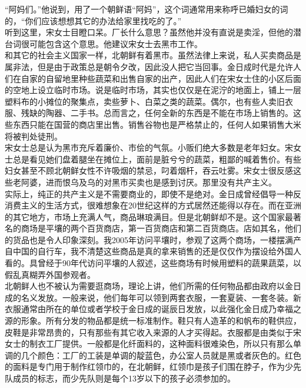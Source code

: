 \begin{multicols}{\theparacolNo}
“阿妈们。”他说到，用了一个朝鲜语“阿妈”，这个词通常用来称呼已婚妇女的词的，“你们应该想想其它的办法给家里找吃的了。”\\

听到这里，宋女士目瞪口呆。厂长什么意思？虽然他并没有直说是卖淫，但他的潜台词很可能包含这个意思。他建议宋女士去黑市工作。\\

和其它的社会主义国家一样，北朝鲜有着黑市。虽然法律上来说，私人买卖商品是属非法，但是由于政策总是朝令夕改，因此没人把它当回事。金日成时代是允许人们在自家的自留地里种些蔬菜和出售自家的出产，因此人们在宋女士住的小区后面的空地上设立临时市场。说是临时市场，其实也仅仅是在泥泞的地面上，铺上一层塑料布的小摊位的聚集点，卖些萝卜、白菜之类的蔬菜。偶尔，也有些人卖旧衣服、残缺的陶器、二手书。总而言之，任何全新的东西是不能在市场上销售的。这些东西只能在国营的商店里出售。销售谷物也是严格禁止的，任何人如果销售大米将被判处徒刑。\\

宋女士总是认为黑市充斥着廉价、市侩的气氛。小贩们绝大多数是老年妇女。宋女士总是看见她们盘着腿坐在摊位上，面前是脏兮兮的蔬菜，粗鄙的喊着售价。有些妇女甚至不顾北朝鲜女性不许吸烟的禁忌，叼着烟杆，吞云吐雾。宋女士很反感这些老阿婆，进而恨乌及乌的对黑市买卖也是感到讨厌。那里没有共产主义。\\

实际上，纯正的共产主义是不需要商业的，即使不是绝对。金日成曾经倡导一种反消费主义的生活方式，很难想象在20世纪这样的方式居然还能得以存在。而在亚洲的其它地方，市场上充满人气，商品琳琅满目。但是北朝鲜却不是。这个国家最著名的商场是平壤的两个百货商店，第一百货商店和第二百货商店。店如其名，他们的货品也是令人印象深刻。我2005年访问平壤时，参观了这两个商场，一楼摆满产自中国的自行车，我不清楚这些商品是真的拿来销售的还是仅仅作为摆设给外国人看的。具曾经于90年代访问平壤的人叙述，这些商场有时候用塑料的蔬果蔬菜，以假乱真糊弄外国参观者。\\

北朝鲜人也不被认为需要逛商场，理论上讲，他们所需的任何物品都由政府以金日成的名义发放。一般来说，他们每年可以领到两套衣服，一套夏装、一套冬装。新衣服通常由所在的单位或者学校于金日成的诞辰日发放，以此强化金日成乃幸福之源的形象。所有分发的物品都是统一标准制作。鞋只有人造革的和帆布的鞋供应，皮鞋是非常昂贵的，只有那些有其它收入来源的人才买得起。衣服都是由类似于宋女士的制衣工厂提供。一般都是化纤面料的，这种面料很难染色，所以只有那么单调的几个颜色：工厂的工装是单调的靛蓝色，办公室人员就是黑或者灰色的。红色的面料是专门用于制作红领巾的，在北朝鲜，红领巾是孩子们围在脖子，作为少先队成员的标志，而少先队则是每个13岁以下的孩子必须参加的。\\


\end{multicols}

